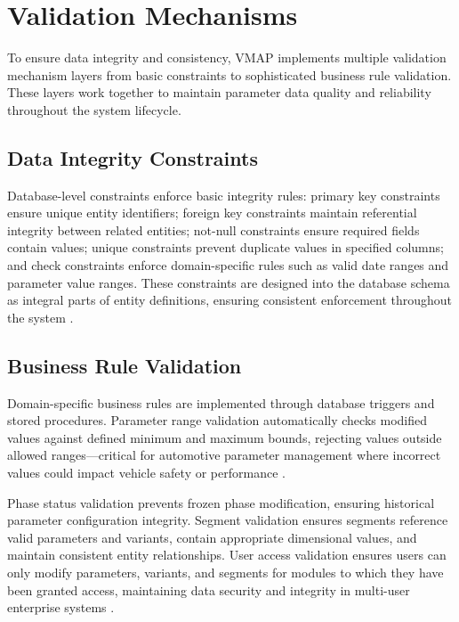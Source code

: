 \section{Validation Mechanisms}
\label{sec:validation-mechanisms}

To ensure data integrity and consistency, VMAP implements multiple validation mechanism layers from basic constraints to sophisticated business rule validation. These layers work together to maintain parameter data quality and reliability throughout the system lifecycle.

\subsection{Data Integrity Constraints}
\label{subsec:data-integrity-constraints}

Database-level constraints enforce basic integrity rules: primary key constraints ensure unique entity identifiers; foreign key constraints maintain referential integrity between related entities; not-null constraints ensure required fields contain values; unique constraints prevent duplicate values in specified columns; and check constraints enforce domain-specific rules such as valid date ranges and parameter value ranges. These constraints are designed into the database schema as integral parts of entity definitions, ensuring consistent enforcement throughout the system \cite{elmasri2015fundamentals}.

\subsection{Business Rule Validation}
\label{subsec:business-rule-validation}

Domain-specific business rules are implemented through database triggers and stored procedures. Parameter range validation automatically checks modified values against defined minimum and maximum bounds, rejecting values outside allowed ranges—critical for automotive parameter management where incorrect values could impact vehicle safety or performance \cite{staron2021automotive}.

Phase status validation prevents frozen phase modification, ensuring historical parameter configuration integrity. Segment validation ensures segments reference valid parameters and variants, contain appropriate dimensional values, and maintain consistent entity relationships. User access validation ensures users can only modify parameters, variants, and segments for modules to which they have been granted access, maintaining data security and integrity in multi-user enterprise systems \cite{sandhu1998role}.

